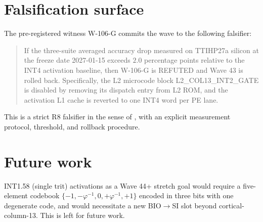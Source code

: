 \section{Falsification surface}

The pre-registered witness W-106-G commits the wave to the following
falsifier:

\begin{quote}
If the three-suite averaged accuracy drop measured on TTIHP27a silicon
at the freeze date 2027-01-15 exceeds $2.0$ percentage points relative
to the INT4 activation baseline, then W-106-G is REFUTED and Wave 43 is
rolled back. Specifically, the L2 microcode block
\textsc{L2\_COL13\_INT2\_GATE} is disabled by removing its dispatch
entry from L2 ROM, and the activation L1 cache is reverted to one INT4
word per PE lane.
\end{quote}

This is a strict R8 falsifier in the sense of
\cite{PopperLogicScientificDiscovery}, with an explicit measurement
protocol, threshold, and rollback procedure.

\section{Future work}

INT1.58 (single trit) activations as a Wave 44+ stretch goal would
require a five-element codebook $\{-1, -\varphi^{-1}, 0, +\varphi^{-1},
+1\}$ encoded in three bits with one degenerate code, and would
necessitate a new BIO$\to$SI slot beyond cortical-column-13. This is
left for future work.


